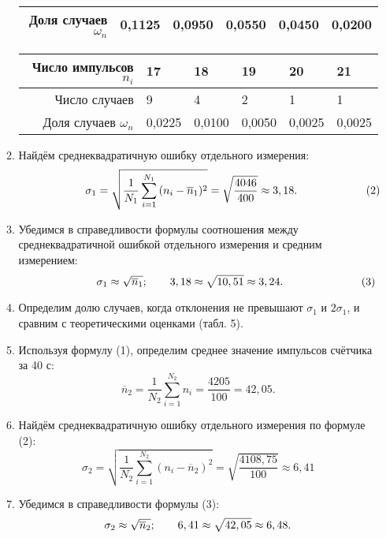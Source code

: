 \documentclass[a4paper, 10pt]{article}
\begin{document}
\begin{enumerate}
\begin{enumerate}
\begin{table}
\begin {center}
\begin{tabular}{|r|p{1cm}|p{1cm}|p{1cm}|p{1cm}|p{1cm}|}
\hline
Доля случаев $\omega_n$&0,1125&0,0950&0,0550&0,0450&0,0200\\
\hline
\end{tabular}
\begin{tabular}{|r|p{1cm}|p{1cm}|p{1cm}|p{1cm}|p{1cm}|}
\hline
Число импульсов $n_i$&17&18&19&20&21\\
\hline
Число случаев&9&4&2&1&1\\
\hline
Доля случаев $\omega_n$&0,0225&0,0100&0,0050&0,0025&0,0025\\
\hline
\end{tabular} \end{center}
\end{table} 
\item Найдём среднеквадратичную ошибку отдельного измерения: \[ \hspace {21 mm} \sigma_1 = \sqrt{\dfrac{1}{N_1} \sum_{i = 1}^{N_1} {(n_i - \overline{n}_1)^2} }  = \sqrt {\dfrac{4046}{400}} \approx 3,18. 	\hspace{22 mm}		(2) 
 \]
\item Убедимся в справедливости формулы соотношения между среднеквадратичной ошибкой отдельного измерения и средним измерением:
\[ \hspace{24 mm} \sigma_1 \approx\sqrt{\overline{n}_1}; \hspace{7 mm} 3,18 \approx\sqrt{10,51} \approx 3,24.  \hspace{25 mm}		(3)  \]
\item Определим долю случаев, когда отклонения не превышают $\sigma_1$ и $2\sigma_1$, и сравним с теоретическими оценками (табл. 5).
\item Используя формулу (1), определим среднее значение импульсов счётчика за 40 с: \[ \overline{n}_2 = \dfrac{1}{N_2} \sum_{i = 1}^{N_2} {n_i} = \frac{4205}{100} = 42,05.
 \]
\item Найдём среднеквадратичную ошибку отдельного измерения по формуле (2):
 \[ \sigma_2 = \sqrt{\dfrac{1}{N_2} \sum_{i = 1}^{N_2} {(n_i - \overline{n}_2)^2} }  = \sqrt {\dfrac{4108,75}{100}} \approx 6,41
 \]
\item  Убедимся в справедливости формулы (3):
\[ \sigma_2 \approx\sqrt{\overline{n}_2}; \hspace{7 mm}  6,41 \approx\sqrt{42,05} \approx 6,48.  \]
 






\end{enumerate}
\end{enumerate}
\end{document}
